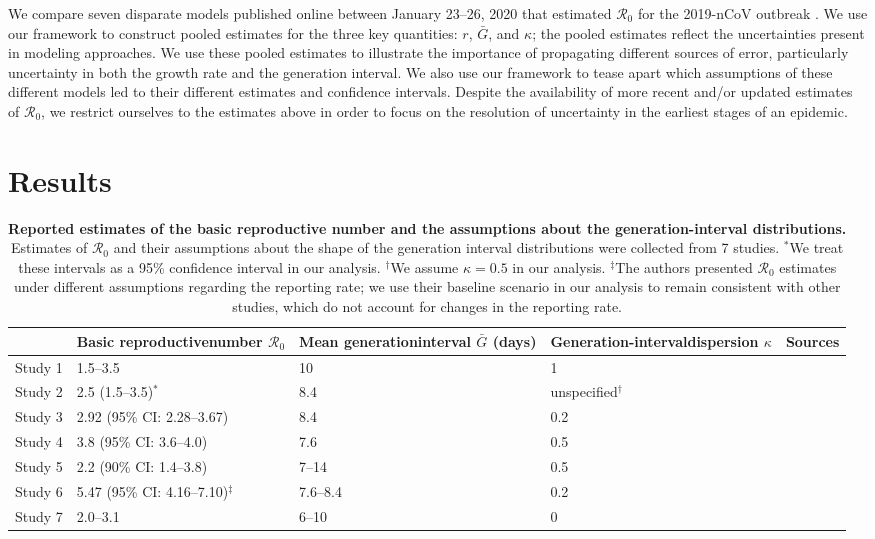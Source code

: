 \documentclass[12pt]{article}
\newcommand{\Ro}{\ensuremath{{\mathcal R}_{0}}\xspace}
\begin{document}
We compare seven disparate models published online between January 23--26, 2020 that estimated \Ro for the 2019-nCoV outbreak \citep{bedfordncov, imaincov, liuncov, majumderncov, readncov, riouncov, zhaoncov}. 
We use our framework to construct pooled estimates for the three key quantities: $r$, $\bar G$, and $\kappa$;
the pooled estimates reflect the uncertainties present in modeling approaches.
We use these pooled estimates to illustrate the importance of propagating different sources of error, particularly uncertainty in both the growth rate and the generation interval.
We also use our framework to tease apart which assumptions of these different models led to their different estimates and confidence intervals. 
Despite the availability of more recent and/or updated estimates of \Ro, we restrict ourselves to the estimates above in order to focus on the resolution of uncertainty in the earliest stages of an epidemic.

\section{Results}

\begin{table}[t]
\begin{center}
\scriptsize
\begin{tabular}{l|p{3.5cm}|p{2.5cm}|p{2.7cm}|l}
 & Basic reproductive\newline number \Ro & Mean generation\newline interval $\bar G$ (days) & Generation-interval\newline dispersion $\kappa$ & Sources \\
\hline
Study 1 & 1.5--3.5 & 10 & 1 & \cite{bedfordncov} \\
\hline
Study 2 & 2.5 (1.5--3.5)$^\ast$ & 8.4 & unspecified$^\dagger$ & \cite{imaincov} \\
\hline
Study 3 & 2.92 (95\% CI: 2.28--3.67) & 8.4 & 0.2 & \cite{liuncov} \\
\hline
Study 4 & 3.8 (95\% CI: 3.6--4.0) & 7.6 & 0.5 & \cite{readncov} \\
\hline
Study 5 & 2.2 (90\% CI: 1.4--3.8) & 7--14 & 0.5 & \cite{riouncov} \\
\hline
Study 6 & 5.47 (95\% CI: 4.16--7.10)$^\ddagger$ & 7.6--8.4 & 0.2 & \cite{zhaoncov} \\
\hline
Study 7 & 2.0--3.1 & 6--10 & 0 & \cite{majumderncov} \\
\hline
\end{tabular}
\end{center}
\caption{
\textbf{Reported estimates of the basic reproductive number and the assumptions about the generation-interval distributions.}
Estimates of \Ro and their assumptions about the shape of the generation interval distributions were collected from 7 studies.
$^\ast$We treat these intervals as a 95\% confidence interval in our analysis.
$^\dagger$We assume $\kappa = 0.5$ in our analysis.
$^\ddagger$The authors presented \Ro estimates under different assumptions regarding the reporting rate; we use their baseline scenario in our analysis to remain consistent with other studies, which do not account for changes in the reporting rate.
}
\end{table}
\end{document}

